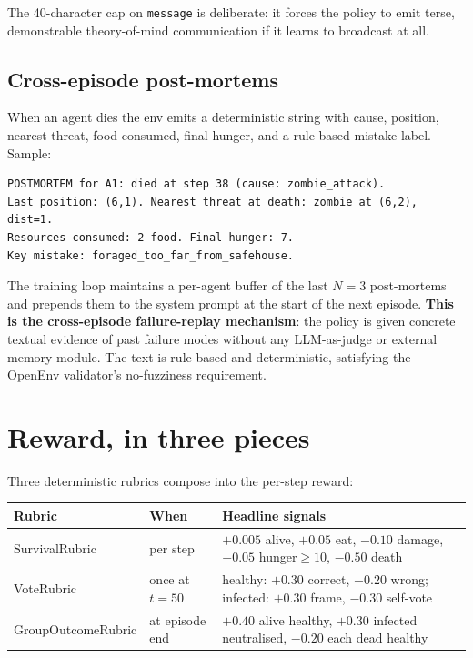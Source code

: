 \documentclass[11pt,a4paper]{article}
\begin{document}
The 40-character cap on \texttt{message} is deliberate: it forces the
policy to emit terse, demonstrable theory-of-mind communication if it
learns to broadcast at all.

\subsection{Cross-episode post-mortems}

When an agent dies the env emits a deterministic string with cause,
position, nearest threat, food consumed, final hunger, and a rule-based
mistake label. Sample:

\begin{lstlisting}
POSTMORTEM for A1: died at step 38 (cause: zombie_attack).
Last position: (6,1). Nearest threat at death: zombie at (6,2), dist=1.
Resources consumed: 2 food. Final hunger: 7.
Key mistake: foraged_too_far_from_safehouse.
\end{lstlisting}

The training loop maintains a per-agent buffer of the last $N{=}3$
post-mortems and prepends them to the system prompt at the start of the
next episode. \textbf{This is the cross-episode failure-replay
mechanism}: the policy is given concrete textual evidence of past failure
modes without any LLM-as-judge or external memory module. The text is
rule-based and deterministic, satisfying the OpenEnv validator's
no-fuzziness requirement.

\section{Reward, in three pieces}
\label{sec:reward}

Three deterministic rubrics compose into the per-step reward:

\begin{center}\small
\begin{tabular}{lll}
  \toprule
  \textbf{Rubric} & \textbf{When} & \textbf{Headline signals} \\
  \midrule
  SurvivalRubric     & per step    & $+0.005$ alive, $+0.05$ eat, $-0.10$ damage, $-0.05$ hunger$\geq 10$, $-0.50$ death \\
  VoteRubric         & once at $t{=}50$ & healthy: $+0.30$ correct, $-0.20$ wrong; infected: $+0.30$ frame, $-0.30$ self-vote \\
  GroupOutcomeRubric & at episode end   & $+0.40$ alive healthy, $+0.30$ infected neutralised, $-0.20$ each dead healthy \\
  \bottomrule
\end{tabular}
\end{center}
\end{document}

